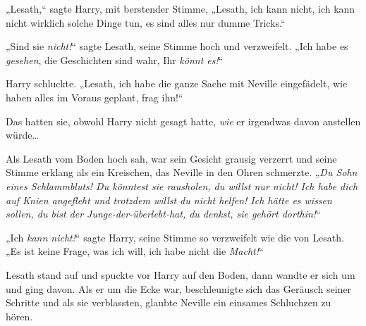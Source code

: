 „Lesath,“ sagte Harry, mit berstender Stimme, „Lesath, ich kann nicht, ich kann nicht wirklich solche Dinge tun, es sind alles nur dumme Tricks.“

„Sind sie \emph{nicht!}“ sagte Lesath, seine Stimme hoch und verzweifelt. „Ich habe es \emph{gesehen}, die Geschichten sind wahr, Ihr \emph{könnt es!}“

Harry schluckte. „Lesath, ich habe die ganze Sache mit Neville eingefädelt, wie haben alles im Voraus geplant, frag ihn!“

Das hatten sie, obwohl Harry nicht gesagt hatte, \emph{wie} er irgendwas davon anstellen würde…

Als Lesath vom Boden hoch sah, war sein Gesicht grausig verzerrt und seine Stimme erklang als ein Kreischen, das Neville in den Ohren schmerzte. „\emph{Du Sohn eines Schlammbluts! Du könntest sie rausholen, du willst nur nicht! Ich habe dich auf Knien angefleht und trotzdem willst du nicht helfen! Ich hätte es wissen sollen, du bist der Junge-der-überlebt-hat, du denkst, sie gehört dorthin!}“

„Ich \emph{kann nicht!}“ sagte Harry, seine Stimme so verzweifelt wie die von Lesath. „Es ist keine Frage, was ich will, ich habe nicht die \emph{Macht!}“

Lesath stand auf und spuckte vor Harry auf den Boden, dann wandte er sich um und ging davon. Als er um die Ecke war, beschleunigte sich das Geräusch seiner Schritte und als sie verblassten, glaubte Neville ein einsames Schluchzen zu hören.

